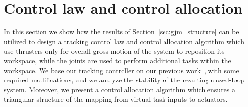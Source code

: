 \documentclass[../main.tex]{subfiles}
\begin{document}








\section{Control law and control allocation}\label{sec:control}
In this section we show how the results of Section~\ref{sec:gjm_structure} can be utilized to design a tracking control law and control allocation algorithm which use thrusters only for overall gross motion of the system to reposition its workspace, while the joints are used to perform additional tasks within the workspace.
We  base our tracking controller on our previous work~\citep{Saeboe2022}, with some required modifications, and we analyze the stability of the resulting closed-loop system. Moreover, we present a control allocation algorithm which ensures a triangular structure of the mapping from virtual task inputs to actuators.
\end{document}
